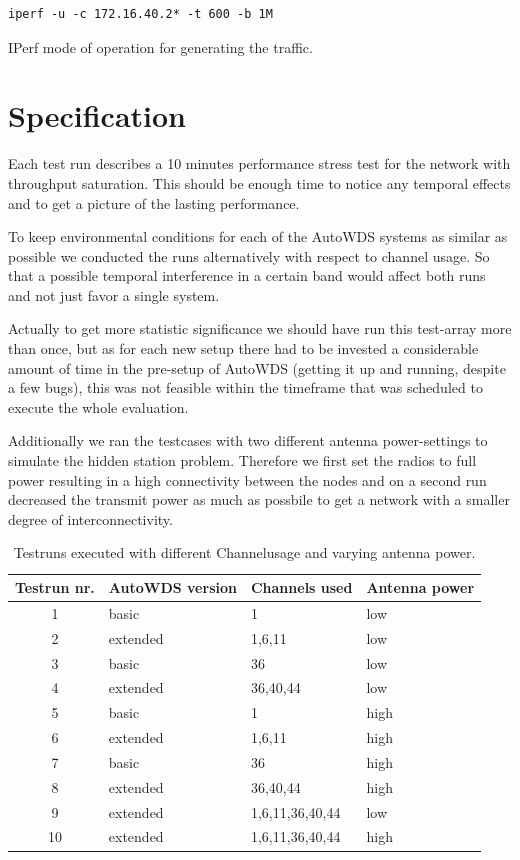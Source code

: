       \begin{listing}[h!]
	\begin{lstlisting}
iperf -u -c 172.16.40.2* -t 600 -b 1M
	\end{lstlisting}
	\caption{IPerf mode of operation for generating the traffic.}
	\label{lst:iperf}
      \end{listing}
    
\newpage
    
  \section{Specification}
    Each test run describes a 10 minutes performance stress test for the network with throughput saturation. 
    This should be enough time to notice any temporal effects and to get a picture of the lasting performance.
    
    To keep environmental conditions for each of the AutoWDS systems as similar as possible we conducted the runs alternatively with respect to channel usage.
    So that a possible temporal interference in a certain band would affect both runs and not just favor a single system.
  
    Actually to get more statistic significance we should have run this test-array more than once, but as for each new setup there had to 
    be invested a considerable amount of time in the pre-setup of AutoWDS (getting it up and running, despite a few bugs), this was not feasible within
    the timeframe that was scheduled to execute the whole evaluation.
    
    Additionally we ran the testcases with two different antenna power-settings to simulate the hidden station problem. Therefore we first set the radios to full power 
    resulting in a high connectivity between the nodes and on a second run decreased the transmit power as much as possbile to get a network with a smaller degree
    of interconnectivity.
  
    \begin{table}[h!]
      \centering
      \begin{tabular}{clll}
	Testrun nr. & AutoWDS version & Channels used & Antenna power\\ \hline
	1 & basic & 1 & low \\
	2 & extended & 1,6,11 & low \\
	3 & basic & 36 & low \\
	4 & extended & 36,40,44 & low \\
	5 & basic & 1 & high \\
	6 & extended & 1,6,11 & high \\
	7 & basic & 36 & high \\
	8 & extended & 36,40,44 & high \\
	9 & extended & 1,6,11,36,40,44 & low \\
	10 & extended & 1,6,11,36,40,44 & high \\
      \end{tabular}
      \caption{Testruns executed with different Channelusage and varying antenna power.}
      \label{tab:testruns}
    \end{table}
    
